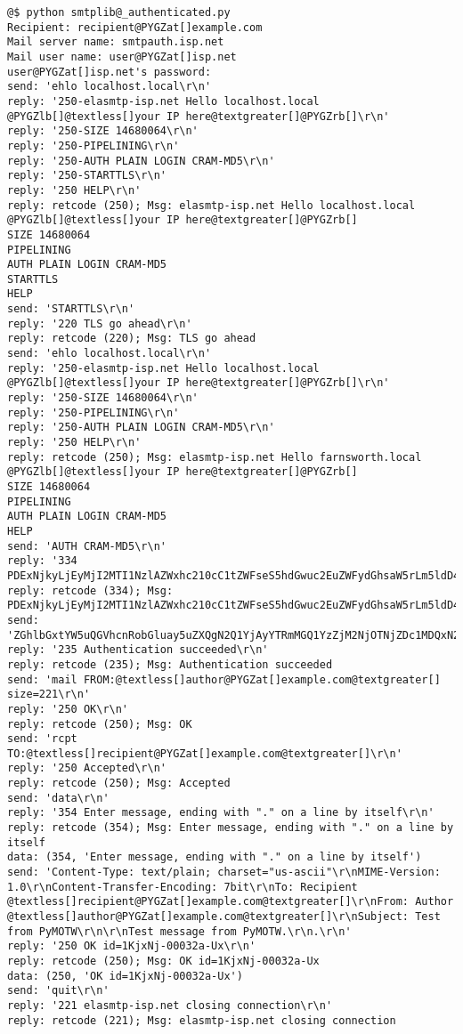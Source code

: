 \documentclass[a4paper,10pt,english]{manual}
\begin{document}
\begin{Verbatim}[commandchars=@\[\]]
@$ python smtplib@_authenticated.py
Recipient: recipient@PYGZat[]example.com
Mail server name: smtpauth.isp.net
Mail user name: user@PYGZat[]isp.net
user@PYGZat[]isp.net's password:
send: 'ehlo localhost.local\r\n'
reply: '250-elasmtp-isp.net Hello localhost.local @PYGZlb[]@textless[]your IP here@textgreater[]@PYGZrb[]\r\n'
reply: '250-SIZE 14680064\r\n'
reply: '250-PIPELINING\r\n'
reply: '250-AUTH PLAIN LOGIN CRAM-MD5\r\n'
reply: '250-STARTTLS\r\n'
reply: '250 HELP\r\n'
reply: retcode (250); Msg: elasmtp-isp.net Hello localhost.local @PYGZlb[]@textless[]your IP here@textgreater[]@PYGZrb[]
SIZE 14680064
PIPELINING
AUTH PLAIN LOGIN CRAM-MD5
STARTTLS
HELP
send: 'STARTTLS\r\n'
reply: '220 TLS go ahead\r\n'
reply: retcode (220); Msg: TLS go ahead
send: 'ehlo localhost.local\r\n'
reply: '250-elasmtp-isp.net Hello localhost.local @PYGZlb[]@textless[]your IP here@textgreater[]@PYGZrb[]\r\n'
reply: '250-SIZE 14680064\r\n'
reply: '250-PIPELINING\r\n'
reply: '250-AUTH PLAIN LOGIN CRAM-MD5\r\n'
reply: '250 HELP\r\n'
reply: retcode (250); Msg: elasmtp-isp.net Hello farnsworth.local @PYGZlb[]@textless[]your IP here@textgreater[]@PYGZrb[]
SIZE 14680064
PIPELINING
AUTH PLAIN LOGIN CRAM-MD5
HELP
send: 'AUTH CRAM-MD5\r\n'
reply: '334 PDExNjkyLjEyMjI2MTI1NzlAZWxhc210cC1tZWFseS5hdGwuc2EuZWFydGhsaW5rLm5ldD4=\r\n'
reply: retcode (334); Msg: PDExNjkyLjEyMjI2MTI1NzlAZWxhc210cC1tZWFseS5hdGwuc2EuZWFydGhsaW5rLm5ldD4=
send: 'ZGhlbGxtYW5uQGVhcnRobGluay5uZXQgN2Q1YjAyYTRmMGQ1YzZjM2NjOTNjZDc1MDQxN2ViYjg=\r\n'
reply: '235 Authentication succeeded\r\n'
reply: retcode (235); Msg: Authentication succeeded
send: 'mail FROM:@textless[]author@PYGZat[]example.com@textgreater[] size=221\r\n'
reply: '250 OK\r\n'
reply: retcode (250); Msg: OK
send: 'rcpt TO:@textless[]recipient@PYGZat[]example.com@textgreater[]\r\n'
reply: '250 Accepted\r\n'
reply: retcode (250); Msg: Accepted
send: 'data\r\n'
reply: '354 Enter message, ending with "." on a line by itself\r\n'
reply: retcode (354); Msg: Enter message, ending with "." on a line by itself
data: (354, 'Enter message, ending with "." on a line by itself')
send: 'Content-Type: text/plain; charset="us-ascii"\r\nMIME-Version: 1.0\r\nContent-Transfer-Encoding: 7bit\r\nTo: Recipient @textless[]recipient@PYGZat[]example.com@textgreater[]\r\nFrom: Author @textless[]author@PYGZat[]example.com@textgreater[]\r\nSubject: Test from PyMOTW\r\n\r\nTest message from PyMOTW.\r\n.\r\n'
reply: '250 OK id=1KjxNj-00032a-Ux\r\n'
reply: retcode (250); Msg: OK id=1KjxNj-00032a-Ux
data: (250, 'OK id=1KjxNj-00032a-Ux')
send: 'quit\r\n'
reply: '221 elasmtp-isp.net closing connection\r\n'
reply: retcode (221); Msg: elasmtp-isp.net closing connection
\end{Verbatim}
\end{document}
